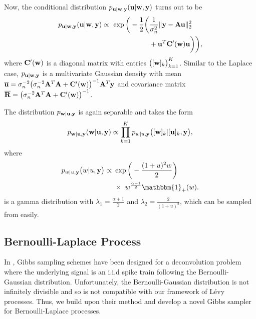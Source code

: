 \documentclass[journal]{IEEEtran}
\begin{document}
Now, the conditional distribution $p_{{\bf{u}} | {\bf{w}}, {\bf{y}}}({\bf{u}} | {\bf{w}}, {\bf{y}})$ turns out to be
\begin{align}\label{eq:conditional_u_student}
    p_{\M u | \M w, \M y}(\M u | \M w, \M y) \propto \ \exp\bigg(-\frac{1}{2}\bigg(&\frac{1}{\sigma_n^2}\|\M y - \M A \M u\|_{2}^{2} \nonumber \\
    & + \M u^{T} \M C'(\M w) \M u \bigg) \bigg),
\end{align}
where ${\bf{C}}'({\bf{w}})$ is a diagonal matrix with entries $\big([{\bf{w}}]_k\big)_{k=1}^{K}$. Similar to the Laplace case, $p_{{\bf{u}} | {\bf{w}}, {\bf{y}}}$ is a multivariate Gaussian density with mean $\overline{{\bf{u}}} = \sigma_n^{-2} \big(\sigma_n^{-2} {\bf{A}}^{T} {\bf{A}} + {\bf{C}}'({\bf{w}})\big)^{-1}{\bf{A}}^{T}{\bf{y}}$ and covariance matrix $\overline{{\bf{R}}} = \big(\sigma_n^{-2} {\bf{A}}^{T} {\bf{A}} + {\bf{C}}'({\bf{w}})\big)^{-1}$. 

The distribution $p_{{\bf{w}} | {\bf{u}}, {\bf{y}}}$ is again separable and takes the form 
\begin{equation}
    p_{{\bf{w}} | {\bf{u}}, {\bf{y}}}({\bf{w}} | {\bf{u}}, {\bf{y}}) \propto \prod_{k=1}^{K} p_{w|u, {\bf{y}}}\big([{\bf{w}}]_k|[{\bf{u}}]_k, {\bf{y}}\big),
\end{equation}
where
\begin{align}\label{eq:conditional_w_student}
    p_{w | u, \M y}\big(w | u, \M y\big) \propto \ &\exp\bigg(-\frac{(1 + u)^2 w}{2}\bigg) \nonumber \\
    &\times \ w^{\frac{\alpha-1}{2}} \mathbbm{1}_{+}(w).
\end{align}
is a gamma distribution with $\lambda_1 = \frac{\alpha + 1}{2}$ and $\lambda_2 = \frac{2}{(1 + u)^2}$, which can be sampled from easily.


\subsection{Bernoulli-Laplace Process}
In \cite{ge2011enhanced}, Gibbs sampling schemes have been designed for a deconvolution problem where the underlying signal is an i.i.d spike train following the Bernoulli-Gaussian distribution. Unfortunately, the Bernoulli-Gaussian distribution is not infinitely divisible and so is not compatible with our framework of L\'{e}vy processes. Thus, we build upon their method and develop a novel Gibbs sampler for Bernoulli-Laplace processes.  
\end{document}
